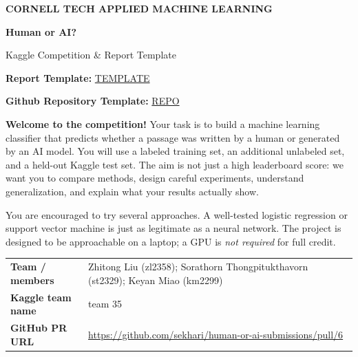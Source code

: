 \documentclass[11pt,letterpaper]{article}
\begin{document}
\thispagestyle{empty}
\vspace*{0.2in}
{\color{teal}\bfseries CORNELL TECH \textbar{} APPLIED MACHINE LEARNING}\par
\vspace{0.15in}
{\Huge\bfseries\color{navy} Human or AI?}\par
\vspace{0.07in}
{\LARGE\color{navy} Kaggle Competition \&  Report Template}\par
\vspace{0.17in}

\textbf{Report Template: }\href{https://www.overleaf.com/project/6ae1fc85355dcf680137d898/share#f2777b20d3adeeecfac9096f78008e2f8daa0ff4be43de3b}{TEMPLATE}

\textbf{Github Repository Template: }\href{https://github.com/sekhari/human-or-ai-submissions}{REPO}

\textbf{Welcome to the competition!} Your task is to build a machine learning classifier that predicts whether a passage was written by a human or generated by an AI model. You will use a labeled training set, an additional unlabeled set, and a held-out Kaggle test set. The aim is not just a high leaderboard score: we want you to compare methods, design careful experiments, understand generalization, and explain what your results actually show.

You are encouraged to try several approaches. A well-tested logistic regression or support vector machine is just as legitimate as a neural network. The project is designed to be approachable on a laptop; a GPU is \emph{not required} for full credit.

\vspace{0.06in}
\begin{tabularx}{\linewidth}{@{}>{\bfseries}p{1.58in}Y@{}}
Team / members & Zhitong Liu (zl2358); Sorathorn Thongpitukthavorn (st2329); Keyan Miao (km2299) \\
Kaggle team name & team 35 \\
GitHub PR URL & \href{https://github.com/sekhari/human-or-ai-submissions/pull/6}{https://github.com/sekhari/human-or-ai-submissions/pull/6} \\
\end{tabularx}
\vspace{0.06in}
\end{document}

